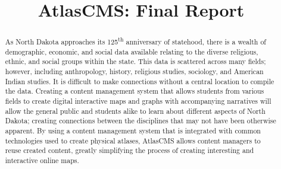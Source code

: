 \documentclass[11pt, final, conference, twocolumn]{IEEEtran}
\begin{document}
\title{AtlasCMS: Final Report}

\author{


\and


\and


\and


}

\maketitle

\begin{abstract}

As North Dakota approaches its 125\textsuperscript{th} anniversary of statehood, there is a wealth of demographic, economic, and social data available relating to the diverse religious, ethnic, and social groups within the state. This data is scattered across many fields; however, including anthropology, history, religious studies, sociology, and American Indian studies. It is difficult to make connections without a central location to compile the data. Creating a content management system that allows students from various fields to create digital interactive maps and graphs with accompanying narratives will allow the general public and students alike to learn about different aspects of North Dakota; creating connections between the disciplines that may not have been otherwise apparent. By using a content management system that is integrated with common technologies used to create physical atlases, AtlasCMS allows content managers to reuse created content, greatly simplifying the process of creating interesting and interactive online maps.

\end{abstract}
\end{document}
